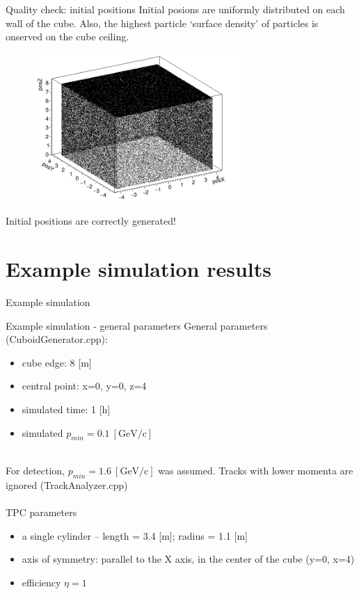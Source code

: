 \documentclass{beamer}
\begin{document}
\begin{frame}{Quality check: initial positions}
Initial posions are uniformly distributed on each wall of the cube. Also, the highest particle `surface density' of particles is onserved on the cube ceiling. 
\begin{figure}
\includegraphics[width=0.70\textwidth]{images/cubefull.png}
\end{figure}
Initial positions are correctly generated!
\end{frame}

\section{Example simulation results}

\begin{frame}
\vfill
\centering
\Huge{Example simulation}

\vfill
\end{frame}

\begin{frame}{Example simulation - general parameters}
General parameters (CuboidGenerator.cpp):
\begin{itemize}
\item cube edge: 8 [m]
\item central point: x=0, y=0, z=4
\item simulated time: 1 [h]
\item simulated $p_{min}=0.1~[\text{GeV/c}]$
\end{itemize}
~\\
For detection, $p_{min} = 1.6~[\text{GeV/c}]$ was assumed. Tracks with lower momenta are ignored (TrackAnalyzer.cpp)
~\\~\\

TPC parameters
\begin{itemize}
\item a single cylinder -- length = 3.4 [m]; radius = 1.1 [m]
\item axis of symmetry: parallel to the X axis, in the center of the cube (y=0, x=4)
\item efficiency $\eta = 1$
\end{itemize}
\end{frame}
\end{document}
